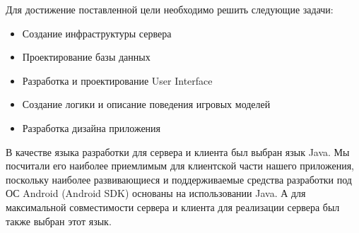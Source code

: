 
Для достижение поставленной цели необходимо решить следующие задачи:%
\begin{itemize}
  \item Создание инфраструктуры сервера

  \item Проектирование базы данных

  \item Разработка и проектирование User Interface
  
  \item Создание логики и описание поведения игровых моделей
  
  \item Разработка дизайна приложения
\end{itemize}

\vspace{3pc}

В качестве языка разработки для сервера и клиента был выбран язык Java. Мы посчитали его наиболее приемлимым для клиентской части нашего приложения, поскольку наиболее развивающиеся и поддерживаемые средства разработки под ОС Android (Android SDK) основаны на использовании Java. А для максимальной совместимости сервера и клиента для реализации сервера был также выбран этот язык.
